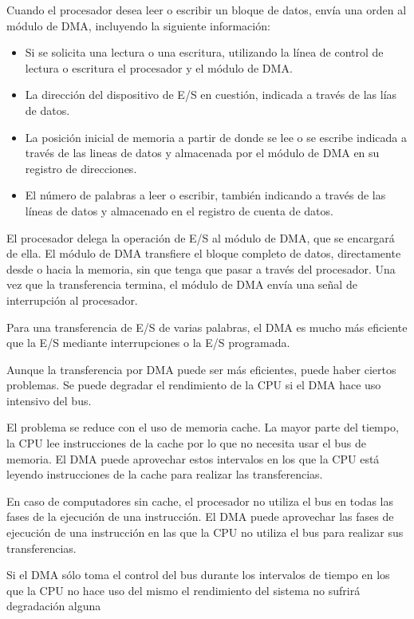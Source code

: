 Cuando el procesador desea leer o escribir un bloque de datos, envía una orden al módulo de DMA, incluyendo la siguiente información:

\begin{itemize}
  \item Si se solicita una lectura o una escritura, utilizando la línea de control de lectura o escritura el procesador y el módulo de DMA.\@
  \item La dirección del dispositivo de E/S en cuestión, indicada a través de las lías de datos.
  \item La posición inicial de memoria a partir de donde se lee o se escribe indicada a través de las lineas de datos y almacenada por el módulo de DMA en su registro de direcciones.
  \item El número de palabras a leer o escribir, también indicando a través de las líneas de datos y almacenado en el registro de cuenta de datos.
\end{itemize}

El procesador delega la operación de E/S al módulo de DMA, que se encargará de ella. El módulo de DMA transfiere el bloque completo de datos, directamente desde o hacia la memoria, sin que tenga que pasar a través del procesador. Una vez que la transferencia termina, el módulo de DMA envía una señal de interrupción al procesador.

Para una transferencia de E/S de varias palabras, el DMA es mucho más eficiente que la E/S mediante interrupciones o la E/S programada.

Aunque la transferencia por DMA puede ser más eficientes, puede haber ciertos problemas. Se puede degradar el rendimiento de la CPU si el DMA hace uso intensivo del bus.

El problema se reduce con el uso de memoria cache. La mayor parte del tiempo, la CPU lee instrucciones de la cache por lo que no necesita usar el bus de memoria. El DMA puede aprovechar estos intervalos en los que la CPU está leyendo instrucciones de la cache para realizar las transferencias.

En caso de computadores sin cache, el procesador no utiliza el bus en todas las fases de la ejecución de una instrucción. El DMA puede aprovechar las fases de ejecución de una instrucción en las que la CPU no utiliza el bus para realizar sus transferencias.

Si el DMA sólo toma el control del bus durante los intervalos de tiempo en los que la CPU no hace uso del mismo el rendimiento del sistema no sufrirá degradación alguna

